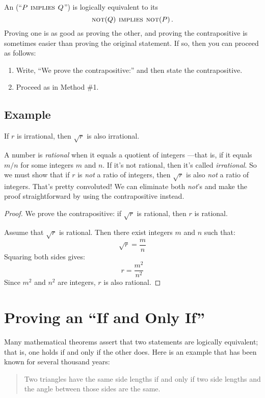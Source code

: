 An  (``$P \mathbin{\mathrm{\textsc{\,implies\,}}} Q$'') is logically equivalent to its
\[
\mathop{\mathrm{\textsc{not}}}(Q) \mathbin{\mathrm{\textsc{\,implies\,}}} \mathop{\mathrm{\textsc{not}}}(P)\,.
\]
Proving one is as good as proving the other, and proving the
contrapositive is sometimes easier than proving the original statement.
If so, then you can proceed as follows:
%
\begin{enumerate}
\item Write, ``We prove the contrapositive:'' and then state the
contrapositive.
\item Proceed as in Method \#1.
\end{enumerate}

\subsection*{Example}

\begin{theorem}
If $r$ is irrational, then $\sqrt{r}$ is also irrational.
\end{theorem}

A number is \emph{rational} when it equals a quotient of integers
---that is, if it equals $m/n$ for some integers $m$ and $n$.  If it's
not rational, then it's called \emph{irrational}.  So we must show
that if $r$ is \textit{not} a ratio of integers, then $\sqrt{r}$ is
also \textit{not} a ratio of integers.  That's pretty convoluted!  We
can eliminate both \emph{not}'s and make the proof straightforward by
using the contrapositive instead.

\begin{proof}
We prove the contrapositive: if $\sqrt{r}$ is rational, then $r$ is
rational.

Assume that $\sqrt{r}$ is rational.  Then there exist integers $m$ and $n$
such that:
%
\[
\sqrt{r} = \frac{m}{n}
\]
%
Squaring both sides gives:
%
\[
r  = \frac{m^2}{n^2}
\]
%
Since $m^2$ and $n^2$ are integers, $r$ is also rational.
\end{proof}

\begin{problems}
\homeworkproblems
{}
\end{problems}

\section{Proving an ``If and Only If''}
\label{sec:prove_iff}

Many mathematical theorems assert that two statements are logically
equivalent; that is, one holds if and only if the other does.  Here is an
example that has been known for several thousand years:
\begin{quote}
Two triangles have the same side lengths if and only if two
side lengths and the angle between those sides are the same.
\end{quote}

